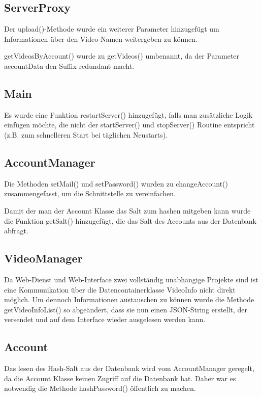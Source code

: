 \subsection{ServerProxy}
Der upload()-Methode wurde ein weiterer Parameter hinzugefügt um Informationen über den Video-Namen weitergeben zu können.  \par  

getVideosByAccount() wurde zu getVideos() umbenannt, da der Parameter accountData den Suffix redundant macht.

\subsection{Main}
Es wurde eine Funktion restartServer() hinzugefügt, falls man zusätzliche Logik einfügen möchte, die nicht der startServer() und stopServer() Routine entspricht (z.B. zum schnelleren Start bei täglichen Neustarts).

\subsection{AccountManager}
Die Methoden setMail() und setPassword() wurden zu changeAccount() zusammengefasst, um die Schnittstelle zu vereinfachen.  \par  

Damit der man der Account Klasse das Salt zum hashen mitgeben kann wurde die Funktion getSalt() hinzugefügt, die das Salt des Accounts aus der Datenbank abfragt.

\subsection{VideoManager} \label{sec:VideoManager}
Da Web-Dienst und Web-Interface zwei vollständig unabhängige Projekte sind ist eine Kommunikation über die Datencontainerklasse VideoInfo nicht direkt möglich. Um dennoch Informationen austauschen zu können wurde die Methode getVideoInfoList() so abgeändert, dass sie nun einen JSON-String erstellt, der versendet und auf dem Interface wieder ausgelesen werden kann.

\subsection{Account}
Das lesen des Hash-Salt aus der Datenbank wird vom AccountManager geregelt, da die Account Klasse keinen Zugriff auf die Datenbank hat. Daher war es notwendig die Methode hashPassword() öffentlich zu machen.

